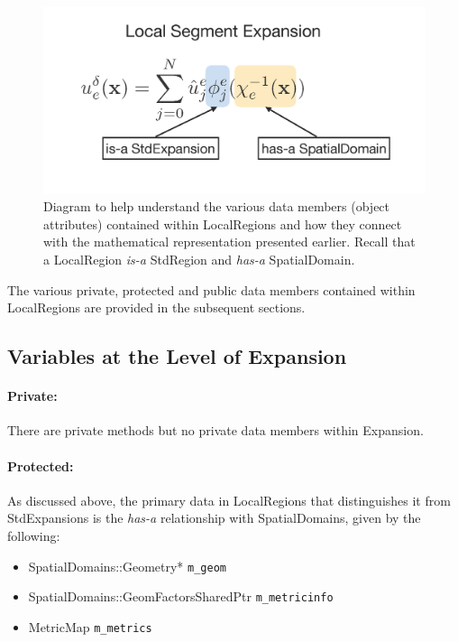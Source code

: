 \begin{figure}[htb]
\centering
\includegraphics[width=6in]{img/LocalExpansion.png}
\caption{Diagram to help understand the various data members (object attributes) contained within LocalRegions and how they connect with the mathematical representation presented earlier.  Recall that a LocalRegion {\em is-a} StdRegion and {\em has-a} SpatialDomain.}
\label{localregions:localexpansion:stdexpansion}
\end{figure}

The various private, protected and public data members contained within LocalRegions are provided in the subsequent sections.

\subsection{Variables at the Level of Expansion}

\paragraph{Private:}

There are private methods but no private data members within Expansion.

\paragraph{Protected:}

As discussed above, the primary data in LocalRegions that distinguishes it from StdExpansions is the {\em has-a} relationship with SpatialDomains, given by the following:

\begin{itemize}
\item SpatialDomains::Geometry*  \verb+m_geom+
%
\item SpatialDomains::GeomFactorsSharedPtr \verb+m_metricinfo+
%
\item MetricMap \verb+m_metrics+
\end{itemize}



